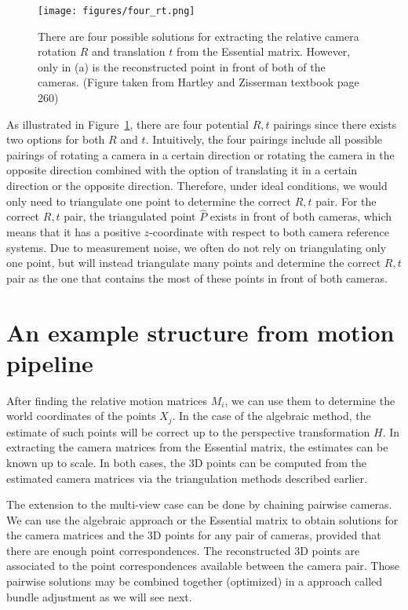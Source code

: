 \documentclass[a4paper, 12pt]{article}
\numberwithin{equation}{section}
\begin{document}
\begin{figure}[h!]
\centering
\texttt{[image: figures/four\_rt.png]}
\caption{There are four possible solutions for extracting the relative camera rotation $R$ and translation $t$ from the Essential matrix. However, only in (a) is the reconstructed point in front of both of the cameras. (Figure taken from Hartley and Zisserman textbook page 260)}
\label{fig:four_rt}
\end{figure}

As illustrated in Figure~\ref{fig:four_rt}, there are four potential $R,t$ pairings since there exists two options for both $R$ and $t$. Intuitively, the four pairings include all possible pairings of rotating a camera in a certain direction or rotating the camera in the opposite direction combined with the option of translating it in a certain direction or the opposite direction. Therefore, under ideal conditions, we would only need to triangulate one point to determine the correct $R,t$ pair. For the correct $R,t$ pair, the triangulated point $\hat{P}$ exists in front of both cameras, which means that it has a positive $z$-coordinate with respect to both camera reference systems. Due to measurement noise, we often do not rely on triangulating only one point, but will instead triangulate many points and determine the correct $R,t$ pair as the one that contains the most of these points in front of both cameras.

\section{An example structure from motion pipeline}
After finding the relative motion matrices $M_i$, we can use them to determine the world coordinates of the points $X_j$. In the case of the algebraic method, the estimate of such points will be correct up to the perspective transformation $H$. In extracting the camera matrices from the Essential matrix, the estimates can be known up to scale. In both cases, the 3D points can be computed from the estimated camera matrices via the triangulation methods described earlier.

The extension to the multi-view case can be done by chaining pairwise cameras. We can use the algebraic approach or the Essential matrix to obtain solutions for the camera matrices and the 3D points for any pair of cameras, provided that there are enough point correspondences. The reconstructed 3D points are associated to the point correspondences available between the camera pair. Those pairwise solutions may be combined together (optimized) in a approach called bundle adjustment as we will see next.
\end{document}
